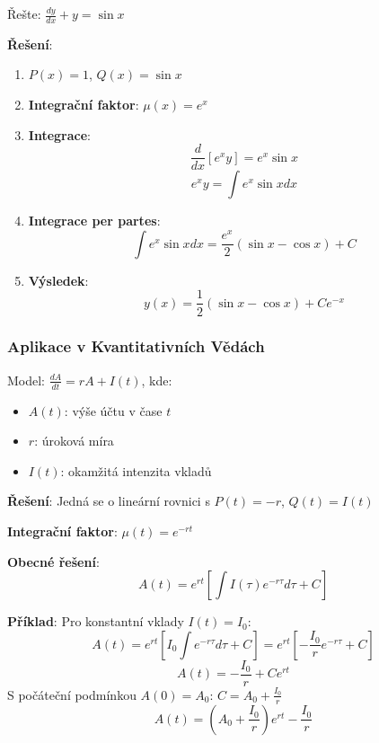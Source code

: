 \begin{example}
Řešte: $\frac{dy}{dx} + y = \sin x$
\vspace{0.3\baselineskip}

\textbf{Řešení}: 
\begin{enumerate}
\item $P(x) = 1$, $Q(x) = \sin x$

\item \textbf{Integrační faktor}: $\mu(x) = e^{x}$

\item \textbf{Integrace}:
\[
\frac{d}{dx}[e^{x}y] = e^{x}\sin x
\]
\[
e^{x}y = \int e^{x}\sin x  dx
\]

\item \textbf{Integrace per partes}:
\[
\int e^{x}\sin x  dx = \frac{e^{x}}{2}(\sin x - \cos x) + C
\]

\item \textbf{Výsledek}:
\[
y(x) = \frac{1}{2}(\sin x - \cos x) + Ce^{-x}
\]
\end{enumerate}
\end{example}

\vspace{0.8\baselineskip}

\subsubsection{Aplikace v Kvantitativních Vědách}
\label{subsubsec:aplikace-kvantitativni-linear}

\begin{application}
Model: $\frac{dA}{dt} = rA + I(t)$, kde:
\begin{itemize}
\item $A(t)$: výše účtu v čase $t$
\item $r$: úroková míra
\item $I(t)$: okamžitá intenzita vkladů
\end{itemize}

\textbf{Řešení}: Jedná se o lineární rovnici s $P(t) = -r$, $Q(t) = I(t)$

\textbf{Integrační faktor}: $\mu(t) = e^{-rt}$

\textbf{Obecné řešení}:
\[
A(t) = e^{rt}\left[\int I(\tau)e^{-r\tau}d\tau + C\right]
\]

\textbf{Příklad}: Pro konstantní vklady $I(t) = I_0$:
\[
A(t) = e^{rt}\left[I_0\int e^{-r\tau}d\tau + C\right] = e^{rt}\left[-\frac{I_0}{r}e^{-r\tau} + C\right]
\]
\[
A(t) = -\frac{I_0}{r} + Ce^{rt}
\]
S počáteční podmínkou $A(0) = A_0$: $C = A_0 + \frac{I_0}{r}$
\[
A(t) = \left(A_0 + \frac{I_0}{r}\right)e^{rt} - \frac{I_0}{r}
\]
\end{application}

